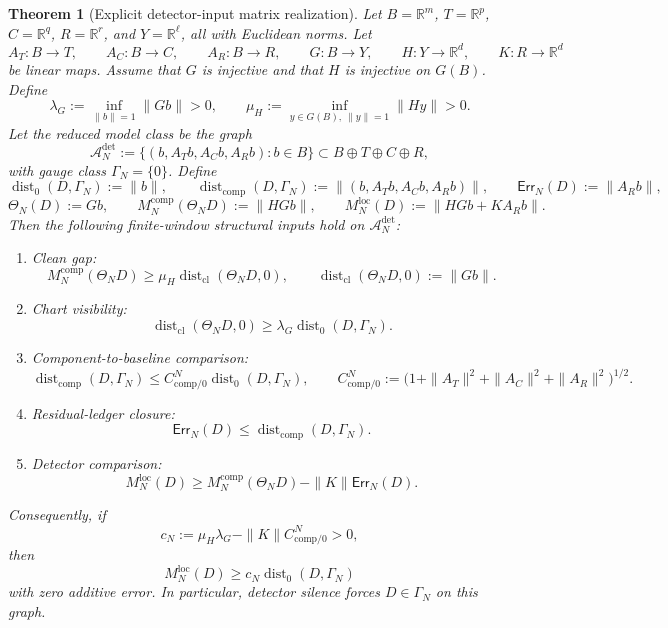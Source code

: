 \documentclass[11pt]{article}
\numberwithin{equation}{section}
\newtheorem{theorem}{Theorem}[section]
\theoremstyle{definition}
\theoremstyle{remark}
\DeclareMathOperator{\dist}{dist}
\newcommand{\loc}{\mathrm{loc}}
\newcommand{\cl}{\mathrm{cl}}
\newcommand{\comp}{\mathrm{comp}}
\newcommand{\Err}{\mathsf{Err}}
\newcommand{\Dist}{\operatorname{dist}}
\newcommand{\calA}{\mathcal A}
\begin{document}
\begin{theorem}[Explicit detector-input matrix realization]\label{thm:explicit-detector-input-matrix-model}
Let \(B=\mathbb R^m\), \(T=\mathbb R^p\), \(C=\mathbb R^q\), \(R=\mathbb R^r\), and \(Y=\mathbb R^\ell\), all with Euclidean norms.  Let
\[
        A_T:B\to T,
        \qquad
        A_C:B\to C,
        \qquad
        A_R:B\to R,
        \qquad
        G:B\to Y,
        \qquad
        H:Y\to \mathbb R^d,
        \qquad
        K:R\to \mathbb R^d
\]
be linear maps.  Assume that \(G\) is injective and that \(H\) is injective on \(G(B)\).  Define
\[
        \lambda_G:=\inf_{\|b\|=1}\|Gb\|>0,
        \qquad
        \mu_H:=\inf_{y\in G(B),\ \|y\|=1}\|Hy\|>0.
\]
Let the reduced model class be the graph
\[
        \calA^{\det}_{N}:=
        \{(b,A_Tb,A_Cb,A_Rb):b\in B\}
        \subset B\oplus T\oplus C\oplus R,
\]
with gauge class \(\Gamma_N=\{0\}\).  Define
\[
        \Dist_0(D,\Gamma_N):=\|b\|,
        \qquad
        \Dist_{\comp}(D,\Gamma_N):=\|(b,A_Tb,A_Cb,A_Rb)\|,
        \qquad
        \Err_N(D):=\|A_Rb\|,
\]
\[
        \Theta_N(D):=Gb,
        \qquad
        M_N^{\comp}(\Theta_ND):=\|HGb\|,
        \qquad
        M_N^{\loc}(D):=\|HGb+KA_Rb\|.
\]
Then the following finite-window structural inputs hold on \(\calA_N^{\det}\):
\begin{enumerate}[label=\textup{(\alph*)},leftmargin=*]
    \item \textup{Clean gap:}
    \[
        M_N^{\comp}(\Theta_ND)\ge \mu_H\dist_{\cl}(\Theta_ND,0),
        \qquad
        \dist_{\cl}(\Theta_ND,0):=\|Gb\|.
    \]
    \item \textup{Chart visibility:}
    \[
        \dist_{\cl}(\Theta_ND,0)\ge \lambda_G\Dist_0(D,\Gamma_N).
    \]
    \item \textup{Component-to-baseline comparison:}
    \[
        \Dist_{\comp}(D,\Gamma_N)
        \le C_{\comp/0}^{N}\Dist_0(D,\Gamma_N),
        \qquad
        C_{\comp/0}^{N}:=\bigl(1+\|A_T\|^2+\|A_C\|^2+\|A_R\|^2\bigr)^{1/2}.
    \]
    \item \textup{Residual-ledger closure:}
    \[
        \Err_N(D)\le \Dist_{\comp}(D,\Gamma_N).
    \]
    \item \textup{Detector comparison:}
    \[
        M_N^{\loc}(D)
        \ge
        M_N^{\comp}(\Theta_ND)-\|K\|\Err_N(D).
    \]
\end{enumerate}
Consequently, if
\[
        c_N:=\mu_H\lambda_G-\|K\|C_{\comp/0}^{N}>0,
\]
then
\[
        M_N^{\loc}(D)
        \ge
        c_N\Dist_0(D,\Gamma_N)
\]
with zero additive error.  In particular, detector silence forces \(D\in\Gamma_N\) on this graph.
\end{theorem}
\end{document}
